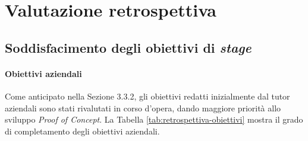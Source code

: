 \chapter{Valutazione retrospettiva}
    \section{Soddisfacimento degli obiettivi di \textit{stage}}
        \subsubsection{Obiettivi aziendali}
        Come anticipato nella Sezione 3.3.2, gli obiettivi redatti inizialmente dal tutor aziendali sono stati rivalutati in corso d'opera, dando maggiore priorità allo sviluppo \textit{Proof of Concept}. La Tabella \ref{tab:retrospettiva-obiettivi} mostra il grado di completamento degli obiettivi aziendali. 

